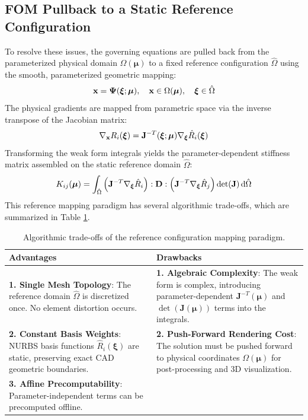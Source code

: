 \subsection{FOM Pullback to a Static Reference Configuration}
To resolve these issues, the governing equations are pulled back from the parameterized physical domain $\Omega(\boldsymbol{\mu})$ to a fixed reference configuration $\hat{\Omega}$ using the smooth, parameterized geometric mapping:
\begin{equation}
\mathbf{x} = \boldsymbol{\Psi}(\boldsymbol{\xi}; \boldsymbol{\mu}), \quad \mathbf{x} \in \Omega(\boldsymbol{\mu}), \quad \boldsymbol{\xi} \in \hat{\Omega}
\end{equation}
The physical gradients are mapped from parametric space via the inverse transpose of the Jacobian matrix:
\begin{equation}
\nabla_{\mathbf{x}} R_i(\boldsymbol{\xi}) = \mathbf{J}^{-T}(\boldsymbol{\xi}; \boldsymbol{\mu}) \nabla_{\boldsymbol{\xi}} \hat{R}_i(\boldsymbol{\xi})
\end{equation}
Transforming the weak form integrals yields the parameter-dependent stiffness matrix assembled on the static reference domain $\hat{\Omega}$:
\begin{equation}
K_{ij}(\boldsymbol{\mu}) = \int_{\hat{\Omega}} \left( \mathbf{J}^{-T} \nabla_{\boldsymbol{\xi}} \hat{R}_i \right) : \mathbf{D} : \left( \mathbf{J}^{-T} \nabla_{\boldsymbol{\xi}} \hat{R}_j \right) \det(\mathbf{J}) \, \mathrm{d}\hat{\Omega}
\end{equation}
This reference mapping paradigm has several algorithmic trade-offs, which are summarized in Table \ref{tab:mapping_tradeoffs}.

\begin{table}[htbp]
\centering
\caption{Algorithmic trade-offs of the reference configuration mapping paradigm.}
\label{tab:mapping_tradeoffs}
\begin{tabular}{p{7cm}p{7cm}}
\toprule
\textbf{Advantages} & \textbf{Drawbacks} \\ \midrule
\textbf{1. Single Mesh Topology}: The reference domain $\hat{\Omega}$ is discretized once. No element distortion occurs. & \textbf{1. Algebraic Complexity}: The weak form is complex, introducing parameter-dependent $\mathbf{J}^{-T}(\boldsymbol{\mu})$ and $\det(\mathbf{J}(\boldsymbol{\mu}))$ terms into the integrals. \\
\textbf{2. Constant Basis Weights}: NURBS basis functions $\hat{R}_i(\boldsymbol{\xi})$ are static, preserving exact CAD geometric boundaries. & \textbf{2. Push-Forward Rendering Cost}: The solution must be pushed forward to physical coordinates $\Omega(\boldsymbol{\mu})$ for post-processing and 3D visualization. \\
\textbf{3. Affine Precomputability}: Parameter-independent terms can be precomputed offline. & \\ \bottomrule
\end{tabular}
\end{table}

